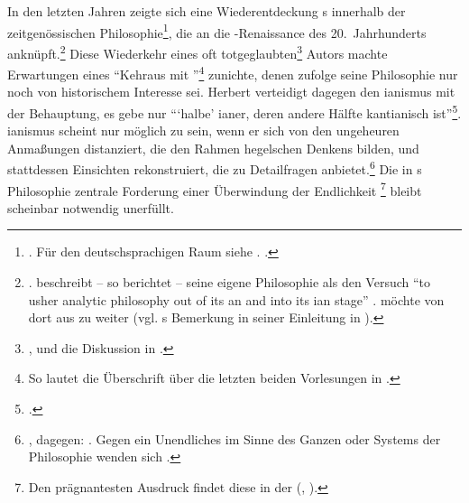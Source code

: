 In den letzten Jahren zeigte sich eine Wiederentdeckung
s innerhalb der zeitgenössischen
Philosophie\footnote{\cite[Vgl.][]{McDowell:MindandWorld1994,McDowell:HavingtheWorldinView2009,McDowell:Self-DeterminingSubjectivityandExternalConstraint2009,McDowell:HegelsIdealismasRadicalizationofKant2008,Brandom:MakingItExplicit1994,Brandom:TalesoftheMightyDead2002}.
Für den deutschsprachigen Raum siehe
\cite{Stekeler-Weithofer:HegelsAnalytischePhilosophie1992,Grau:EinKreisvonKreisen2001,Quante:HegelsBegriffderHandlung1993,Halbig:ObjektivesDenken2002}.
\cite[Siehe auch den Überblick in][]{Quante:AbsolutesDenken1996}.}, die an die
-Renaissance des 20.\ Jahrhunderts
anknüpft.\footnote{\cite[Siehe][]{Sellars:SienceandMetaphysics1968,Strawson:TheBoundsofSense1975}.
 beschreibt -- so berichtet  -- seine eigene
Philosophie als den Versuch \enquote{to usher analytic philosophy out of its
an and into its ian stage}
\parencite[][3]{Sellars:EmpiricismandthePhilosophyofMind1997}.
 möchte von dort aus zu 
weiter \mkbibparens{vgl. s Bemerkung in seiner Einleitung
in \cite[][\pno~8f.]{Sellars:EmpiricismandthePhilosophyofMind1997}}.} Diese
Wiederkehr eines oft
totgeglaubten\footnote{\cite[Siehe][]{Schnaedelbach:WarumHegel?1999}, und die
Diskussion in \cite{Stekeler-Weithofer:StreitumHegel2000}.} Autors machte
Erwartungen eines \enquote{Kehraus mit
}\footnote{So lautet die Überschrift über die
letzten beiden Vorlesungen in
\cite[][293--357]{Tugendhat:SelbstbewusstseinundSelbstbestimmung1979}.}
zunichte, denen zufolge seine Philosophie nur noch von historischem Interesse
sei. Herbert  verteidigt dagegen den ianismus mit
der Behauptung, es gebe nur \enquote{\enquote{halbe} ianer, deren
andere Hälfte kantianisch
ist}\footnote{\cite[][835]{Schnaedelbach:WirKantianer2005}.}. ianismus
scheint nur möglich zu sein, wenn er sich von den ungeheuren Anmaßungen
distanziert, die den Rahmen hegelschen Denkens bilden, und
stattdessen Einsichten rekonstruiert, die  zu Detailfragen
anbietet.\footnote{\cite[Vgl.][]{Sandkaulen:SystemundSystemkritik2006,Halbig:Einleitung2004,Loewith:AktualitaetundInaktualitaetHegels1973},
dagegen: \cite{Stekeler-Weithofer:TheQuestionofSystem2006}. Gegen ein Unendliches im Sinne des
Ganzen oder Systems der Philosophie wenden sich
\cite{Schnaedelbach:SystemundGeschichte2003,Schneiders:VomWeltweisenzumGottverdammten1988}.} Die in
s Philosophie zentrale Forderung einer Überwindung der Endlichkeit%
\footnote{\label{Anmerkung:hegelsforderungnachunendlichkeit}Den prägnantesten
Ausdruck findet diese in der 
\mkbibparens{\cite[vgl.][]{Hegel:WissenschaftderLogikI1986},
\cite[][XXI: 142.15--21]{Hegel:GesammelteWerke}}.} bleibt scheinbar
notwendig unerfüllt.


